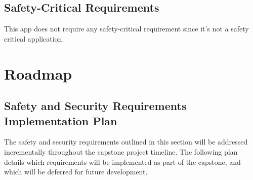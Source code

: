 \documentclass{article}
\begin{document}
\subsection{Safety-Critical Requirements}
This app does not require any safety-critical requirement since it's not a safety critical application. 



\section{Roadmap}

\subsection{Safety and Security Requirements Implementation Plan}
The safety and security requirements outlined in this section will be addressed incrementally throughout the capstone project timeline. The following plan details which requirements will be implemented as part of the capstone, and which will be deferred for future development.
\end{document}
